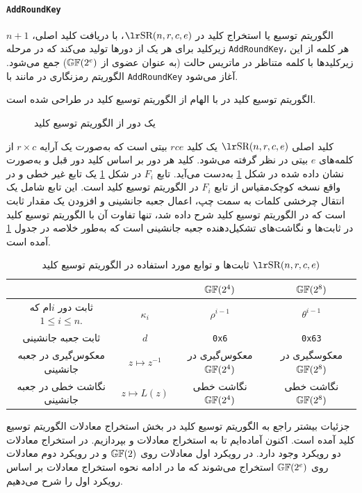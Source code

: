 \paragraph*{\texttt{AddRoundKey}}
الگوریتم توسیع یا استخراج کلید در 
$\text{\en{SR}}(n,r,c,e)$، 
با دریافت کلید اصلی، 
$n + 1$
زیرکلید برای هر یک از دورها تولید می‌کند که در مرحله 
\texttt{AddRoundKey}، 
هر کلمه از این زیرکلیدها با کلمه متناظر در ماتریس حالت (به عنوان عضوی از 
$\mathbb{GF}(2^{e})$) 
جمع می‌شود.  الگوریتم رمزنگاری در 
مانند 
با 
\texttt{AddRoundKey}
آغاز می‌شود.

الگوریتم توسیع کلید در 
با الهام از الگوریتم توسیع کلید در 
طراحی شده است. 
\begin{figure}[h]
\begin{center}

\caption{یک دور از الگوریتم توسیع  کلید  
}
\label{fig:SR_keyschedule}
\end{center}
\end{figure}
کلید اصلی 
$\text{\en{SR}}(n,r,c,e)$
یک کلید 
$rce$
بیتی است که به‌صورت یک آرایه 
$r\times c$
از کلمه‌های 
$e$
بیتی در نظر گرفته می‌شود. کلید هر دور بر اساس کلید دور قبل و به‌صورت نشان داده شده در شکل 
\ref{fig:SR_keyschedule}
به‌دست می‌آید. تابع 
$F_{i}$
در شکل 
\ref{fig:SR_keyschedule}
 یک تابع غیر خطی و در واقع نسخه کوچک‌مقیاس از تابع 
 $F_{i}$
 در الگوریتم توسیع کلید 
است. این تابع شامل یک انتقال چرخشی کلمات به سمت چپ، اعمال جعبه جانشینی و افزودن یک مقدار ثابت است که در الگوریتم توسیع کلید 
شرح داده شد، تنها تفاوت آن با الگوریتم توسیع کلید 
در ثابت‌ها و نگاشت‌های تشکیل‌دهنده جعبه جانشینی است که به‌طور خلاصه در جدول 
\ref{tab:SR_KeySchedule_Const_Summary}
آمده است. 
\begin{table}
\begin{center}
\begin{tabular}{||c||c|c|c||}
	\hline
	\rule[-1ex]{0pt}{2.5ex} & &  $\mathbb{GF}(2^{4})$ & $\mathbb{GF}(2^{8})$ \\ 
	\hline 
	\hline
	\rule[-1ex]{0pt}{2.5ex} ثابت دور
	$i$ام 
	که 
	$1\leq i\leq n$.
	  & $\kappa_{i}$ & $\rho^{i-1}$ & $\theta^{i-1}$ \\ 
	\hline 
	\rule[-1ex]{0pt}{2.5ex} ثابت جعبه جانشینی & $d$ & \texttt{0x6} & \texttt{0x63} \\ 
	\hline 
	\rule[-1ex]{0pt}{2.5ex}   معکوس‌گیری در جعبه جانشینی & $z\mapsto z^{-1}$ & 
	معکوس‌گیری در 
	$\mathbb{GF}(2^{4})$
	 &
	 معکوسگیری در 
	 $\mathbb{GF}(2^{8})$ \\ 
	\hline 
	\rule[-1ex]{0pt}{2.5ex} نگاشت خطی در جعبه جانشینی & $z\mapsto L(z)$ &
	 نگاشت خطی 
	 $\mathbb{GF}(2^{4})$
	& نگاشت خطی 
	$\mathbb{GF}(2^{8})$\\ 
	\hline 
\end{tabular} 
\caption{ثابت‌ها و توابع مورد استفاده در الگوریتم توسیع کلید
	$\text{\en{SR}}(n,r,c,e)$}
\label{tab:SR_KeySchedule_Const_Summary}
\end{center}
\end{table}
جزئیات بیشتر راجع به  الگوریتم توسیع کلید  در بخش استخراج معادلات الگوریتم توسیع کلید آمده است. اکنون آماده‌ایم تا به استخراج معادلات 
و 
بپردازیم. در استخراج معادلات دو رویکرد وجود دارد. در رویکرد اول معادلات  روی 
$\mathbb{GF}(2)$
و در رویکرد دوم معادلات  روی 
$\mathbb{GF}(2^{e})$
استخراج می‌شوند که ما در ادامه  نحوه استخراج معادلات بر اساس رویکرد اول را شرح می‌دهیم. 
